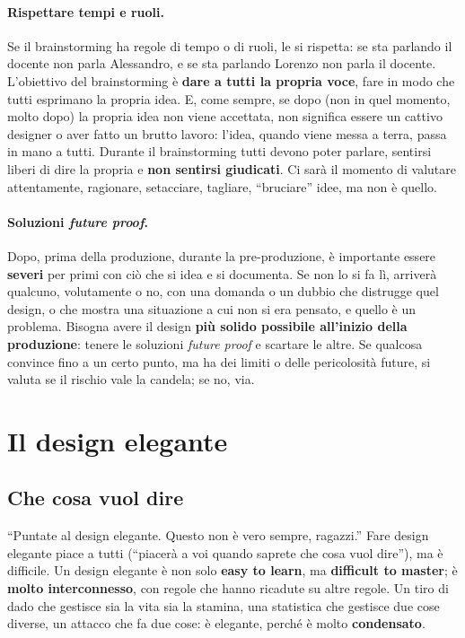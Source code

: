 \paragraph{Rispettare tempi e ruoli.} Se il brainstorming ha regole di tempo o
di ruoli, le si rispetta: se sta parlando il docente non parla Alessandro, e
se sta parlando Lorenzo non parla il docente. L'obiettivo del brainstorming è
\textbf{dare a tutti la propria voce}, fare in modo che tutti esprimano la
propria idea. E, come sempre, se dopo (non in quel momento, molto dopo) la
propria idea non viene accettata, non significa essere un cattivo designer o
aver fatto un brutto lavoro: l'idea, quando viene messa a terra, passa in
mano a tutti. Durante il brainstorming tutti devono poter parlare, sentirsi
liberi di dire la propria e \textbf{non sentirsi giudicati}. Ci sarà il momento
di valutare attentamente, ragionare, setacciare, tagliare, ``bruciare'' idee,
ma non è quello.

\paragraph{Soluzioni \emph{future proof}.} Dopo, prima della produzione, durante
la pre-produzione, è importante essere \textbf{severi} per primi con ciò che
si idea e si documenta. Se non lo si fa lì, arriverà qualcuno, volutamente o
no, con una domanda o un dubbio che distrugge quel design, o che mostra una
situazione a cui non si era pensato, e quello è un problema. Bisogna avere
il design \textbf{più solido possibile all'inizio della produzione}: tenere le
soluzioni \emph{future proof} e scartare le altre. Se qualcosa convince fino
a un certo punto, ma ha dei limiti o delle pericolosità future, si valuta se
il rischio vale la candela; se no, via.

\section{Il design elegante}
\label{sec:design-elegante}

\subsection{Che cosa vuol dire}

``Puntate al design elegante. Questo non è vero sempre, ragazzi.'' Fare design
elegante piace a tutti (``piacerà a voi quando saprete che cosa vuol dire''), ma
è difficile. Un design elegante è non solo \textbf{easy to learn}, ma
\textbf{difficult to master}; è \textbf{molto interconnesso}, con regole che
hanno ricadute su altre regole. Un tiro di dado che gestisce sia la vita sia
la stamina, una statistica che gestisce due cose diverse, un attacco che fa
due cose: è elegante, perché è molto \textbf{condensato}.


